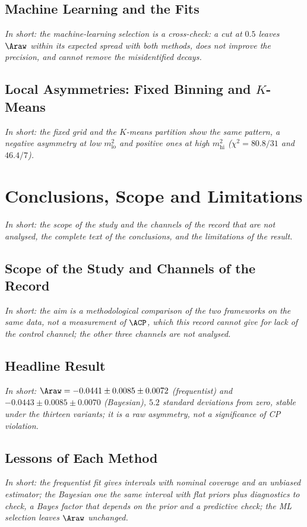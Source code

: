 \subsection{Machine Learning and the Fits}
\label{sec:comparison_ml}
\emph{In short: the machine-learning selection is a cross-check: a cut at $0.5$ leaves $\Araw$ within its expected spread with both methods, does not improve the precision, and cannot remove the misidentified decays.}

\subsection{Local Asymmetries: Fixed Binning and $K$-Means}
\label{sec:comparison_local}
\emph{In short: the fixed grid and the $K$-means partition show the same pattern, a negative asymmetry at low $m^2_{\mathrm{lo}}$ and positive ones at high $m^2_{\mathrm{hi}}$ ($\chi^2=80.8/31$ and $46.4/7$).}

\FloatBarrier

\section{Conclusions, Scope and Limitations}
\label{app:conclusions}
\emph{In short: the scope of the study and the channels of the record that are not analysed, the complete text of the conclusions, and the limitations of the result.}
\subsection{Scope of the Study and Channels of the Record}
\emph{In short: the aim is a methodological comparison of the two frameworks on the same data, not a measurement of $\ACP$, which this record cannot give for lack of the control channel; the other three channels are not analysed.}

\subsection{Headline Result}
\emph{In short: $\Araw=-0.0441\pm0.0085\pm0.0072$ (frequentist) and $-0.0443\pm0.0085\pm0.0070$ (Bayesian), $5.2$ standard deviations from zero, stable under the thirteen variants; it is a raw asymmetry, not a significance of CP violation.}

\subsection{Lessons of Each Method}
\emph{In short: the frequentist fit gives intervals with nominal coverage and an unbiased estimator; the Bayesian one the same interval with flat priors plus diagnostics to check, a Bayes factor that depends on the prior and a predictive check; the ML selection leaves $\Araw$ unchanged.}

